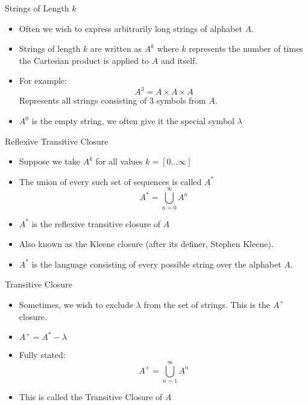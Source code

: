 \documentclass{beamer}
\begin{document}
\begin{frame}{Strings of Length $k$}
\begin{itemize}[<+->]
    \item Often we wish to express arbitrarily long strings of
        alphabet $A$.
    \item Strings of length $k$ are written as $A^k$ where $k$
        represents the number of times the Cartesian product is applied to
        $A$ and itself.
    \item For example:
    \[
    A^3 = A \times A \times A
    \]
    Represents all strings consisting of $3$ symbols from $A$.
    \item $A^0$ is the empty string, we often give it the special
    symbol $\lambda$
\end{itemize}
\end{frame}

\begin{frame}{Reflexive Transitive Closure}
\begin{itemize}[<+->]
    \item Suppose we take $A^k$ for all values $k=[0\ldots \infty]$
    \item The union of every such set of sequences is called $A^*$
    \[
        A^* = \bigcup\limits_{n=0}^{\infty} A^n
    \]
    \item $A^*$ is the reflexive transitive closure of $A$
    \item Also known as the Kleene closure (after its definer, Stephen
    Kleene).
    \item $A^*$ is the language consisting of every possible string
    over the alphabet $A$.
\end{itemize}
\end{frame}

\begin{frame}{Transitive Closure}
\begin{itemize}[<+->]
    \item Sometimes, we wish to exclude $\lambda$ from the set of
    strings.  This is the $A^+$ closure.
    \item $A^+ = A^* - \lambda$
    \item Fully stated:
    \[
        A^+ = \bigcup\limits_{n=1}^{\infty} A^n     
    \]
    \item This is called the Transitive Closure of $A$
\end{itemize}
\end{frame}
\end{document}
